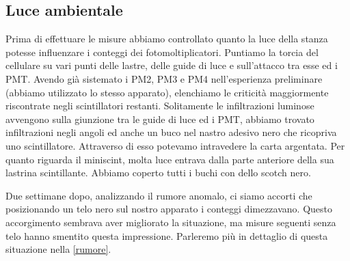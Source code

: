 \subsection{Luce ambientale}

Prima di effettuare le misure abbiamo controllato quanto la luce della stanza potesse influenzare i conteggi dei fotomoltiplicatori.
Puntiamo la torcia del cellulare su vari punti delle lastre, delle guide di luce e sull'attacco tra esse ed i PMT. Avendo già sistemato i PM2, PM3 e PM4 nell'esperienza preliminare (abbiamo utilizzato lo stesso apparato), elenchiamo le criticità maggiormente riscontrate negli scintillatori restanti. Solitamente le infiltrazioni luminose avvengono sulla giunzione tra le guide di luce ed i PMT, abbiamo trovato infiltrazioni negli angoli ed anche un buco nel nastro adesivo nero che ricopriva uno scintillatore. Attraverso di esso potevamo intravedere la carta argentata. Per quanto riguarda il miniscint, molta luce entrava dalla parte anteriore della sua lastrina scintillante.
Abbiamo coperto tutti i buchi con dello scotch nero.

Due settimane dopo, analizzando il rumore anomalo, ci siamo accorti che posizionando un telo nero sul nostro apparato i conteggi dimezzavano. Questo accorgimento sembrava aver migliorato la situazione, ma misure seguenti senza telo hanno smentito questa impressione. Parleremo più in dettaglio di questa situazione nella \autoref{rumore}.